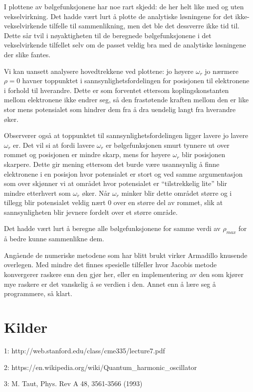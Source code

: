\documentclass[norsk, 12pt]{article}
\begin{document}
I plottene av bølgefunksjonene har noe rart skjedd: de her helt like med og uten vekselvirkning. Det hadde vært lurt
å plotte de analytiske løsningene for det ikke-vekselvirkende tilfelle til sammenlikning, men det ble det dessverre ikke
tid til. Dette sår tvil i nøyaktigheten til de beregnede bølgefunksjonene i det vekselvirkende tilfellet selv om de passet
veldig bra med de analytiske løsningene der slike fantes.

Vi kan uansett analysere hovedtrekkene ved plottene: jo høyere $\omega_r$ jo nærmere $\rho = 0$ havner toppunktet
i sannsynlighetsfordelingen for posisjonen til elektronene i forhold til hverandre. Dette er som forventet ettersom
koplingskonstanten mellom elektronene ikke endrer seg, så den frastøtende kraften mellom den er like stor mens
potensialet som hindrer dem fra å dra uendelig langt fra hverandre øker.

Observerer også at toppunktet til sannsynlighetsfordelingen ligger lavere jo lavere $\omega_r$ er. Det vil si at fordi
lavere $\omega_r$ er bølgefunksjonen smurt tynnere ut over rommet og posisjonen er mindre skarp, mens for høyere
$\omega_r$ blir posisjonen skarpere.
Dette gir mening ettersom det burde være usannsynlig å finne elektronene i en posisjon hvor potensialet er stort
og ved samme argumentasjon som over skjønner vi at området hvor potensialet er ``tilstrekkelig lite'' blir mindre etterhvert
som $\omega_r$ øker. Når $\omega_r$ minker blir dette området større og i tillegg blir potensialet veldig nært 0
over en større del av rommet, slik at sannsynligheten blir jevnere fordelt over et større område.

Det hadde vært lurt å beregne alle bølgefunksjonene for samme verdi av $\rho_{max}$ for å bedre kunne sammenlikne dem.

Angående de numeriske metodene som har blitt brukt virker Armadillo knusende overlegen. Med mindre det finnes
spesielle tilfeller hvor Jacobis metode konvergerer raskere enn den gjør her, eller en implementering av den som
kjører mye raskere er det vanskelig å se verdien i den. Annet enn å lære seg å programmere, så klart.

\section{Kilder}


1: http://web.stanford.edu/class/cme335/lecture7.pdf


2: https://en.wikipedia.org/wiki/Quantum\_harmonic\_oscillator

3:  M. Taut, Phys. Rev A 48, 3561-3566 (1993)
\end{document}
